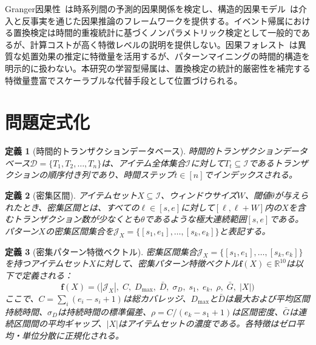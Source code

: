 \documentclass[sigconf,nonacm]{acmart}
\newtheorem{definition}{定義}
\begin{document}
Granger因果性~\cite{granger1969investigating}は時系列間の予測的因果関係を検定し、構造的因果モデル~\cite{pearl2009causality}は介入と反事実を通じた因果推論のフレームワークを提供する。イベント帰属における置換検定は時間的重複統計に基づくノンパラメトリック検定として一般的であるが、計算コストが高く特徴レベルの説明を提供しない。因果フォレスト~\cite{wager2018estimation}は異質な処置効果の推定に特徴量を活用するが、パターンマイニングの時間的構造を明示的に扱わない。本研究の学習型帰属は、置換検定の統計的厳密性を補完する特徴量豊富でスケーラブルな代替手段として位置づけられる。

\section{問題定式化}
\label{sec:formulation}

\begin{definition}[時間的トランザクションデータベース]
時間的トランザクションデータベース$\mathcal{D} = \{T_1, T_2, \ldots, T_n\}$は、アイテム全体集合$\mathcal{I}$に対して$T_t \subseteq \mathcal{I}$であるトランザクションの順序付き列であり、時間ステップ$t \in [n]$でインデックスされる。
\end{definition}

\begin{definition}[密集区間]
アイテムセット$X \subseteq \mathcal{I}$、ウィンドウサイズ$W$、閾値$\theta$が与えられたとき、\emph{密集区間}とは、すべての$\ell \in [s, e]$に対して$[\ell, \ell + W]$内の$X$を含むトランザクション数が少なくとも$\theta$であるような極大連続範囲$[s, e]$である。パターン$X$の密集区間集合を$\mathcal{J}_X = \{[s_1, e_1], \ldots, [s_k, e_k]\}$と表記する。
\end{definition}

\begin{definition}[密集パターン特徴ベクトル]
\label{def:dpfv}
密集区間集合$\mathcal{J}_X = \{[s_1, e_1], \ldots, [s_k, e_k]\}$を持つアイテムセット$X$に対して、\emph{密集パターン特徴ベクトル}$\mathbf{f}(X) \in \mathbb{R}^{10}$は以下で定義される：
\[
\mathbf{f}(X) = \bigl(|\mathcal{J}_X|,\; C,\; D_{\max},\; \bar{D},\; \sigma_D,\; s_1,\; e_k,\; \rho,\; \bar{G},\; |X|\bigr)
\]
ここで、$C = \sum_{i} (e_i - s_i + 1)$は総カバレッジ、$D_{\max}$と$\bar{D}$は最大および平均区間持続時間、$\sigma_D$は持続時間の標準偏差、$\rho = C / (e_k - s_1 + 1)$は区間密度、$\bar{G}$は連続区間間の平均ギャップ、$|X|$はアイテムセットの濃度である。各特徴はゼロ平均・単位分散に正規化される。
\end{definition}
\end{document}

